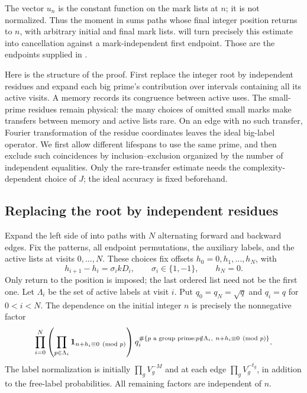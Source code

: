 The vector $u_n$ is the constant function on the mark lists at $n$; it is
not normalized.  Thus the moment in  sums
paths whose final integer position returns to $n$, with arbitrary initial
and final mark lists.   will turn precisely
this estimate into cancellation against a mark-independent first
endpoint.  Those are the endpoints supplied in .

Here is the structure of the proof.  First replace the integer root by
independent residues and expand each big prime's contribution over
intervals containing all its active visits.  A memory records
its congruence between active uses.  The small-prime residues remain
physical: the many choices of omitted small marks make transfers between
memory and active lists rare.  On an edge with no such transfer, Fourier
transformation of the residue coordinates leaves the ideal big-label
operator.  We first allow different lifespans to use the same prime,
and then exclude such coincidences by inclusion--exclusion organized
by the number of independent equalities.  Only the rare-transfer
estimate needs the complexity-dependent choice of $J$; the ideal accuracy
is fixed beforehand.

\subsection{Replacing the root by independent residues}

Expand the left side of  into paths
with $N$ alternating forward and backward edges.  Fix the
patterns, all endpoint permutations, the auxiliary labels, and
the active lists at visits $0,\ldots,N$.  These choices fix
offsets $h_0=0,h_1,\ldots,h_N$, with
\[
 h_{i+1}-h_i=\sigma_i kD_i,\qquad \sigma_i\in\{1,-1\},
 \qquad h_N=0.
\]
Only return to the position is imposed; the last ordered list
need not be the first one.  Let $\Lambda_i$ be the set of active
labels at visit $i$.  Put $q_0=q_N=\sqrt q$ and $q_i=q$ for
$0<i<N$.  The dependence on the initial integer $n$ is precisely
the nonnegative factor
\begin{equation}\label{eq:path-residue-factor}
 \prod_{i=0}^N\left(
 \prod_{p\in\Lambda_i}\mathbf 1_{n+h_i\equiv0\pmod p}\right)
 q_i^{\#\{p\text{ a group prime}:p\notin\Lambda_i,
                                      \ n+h_i\equiv0\pmod p\}}.
\end{equation}
The label normalization is initially $\prod_gV_g^{-M}$ and at
each edge $\prod_gV_g^{-t_g}$, in addition to the free-label
probabilities.  All remaining factors are independent of $n$.

